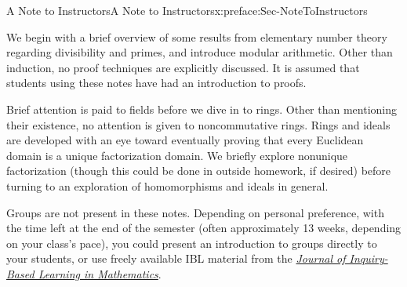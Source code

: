 \documentclass[oneside,10pt,]{book}
\numberwithin{equation}{section}
\begin{document}
\begin{preface}{A Note to Instructors}{}{A Note to Instructors}{}{}{x:preface:Sec-NoteToInstructors}
\begin{itemize}[label=\textbullet]
\end{itemize}
%
\par
We begin with a brief overview of some results from elementary number theory regarding divisibility and primes, and introduce modular arithmetic. Other than induction, no proof techniques are explicitly discussed. It is assumed that students using these notes have had an introduction to proofs.%
\par
Brief attention is paid to fields before we dive in to rings. Other than mentioning their existence, no attention is given to noncommutative rings. Rings and ideals are developed with an eye toward eventually proving that every Euclidean domain is a unique factorization domain. We briefly explore nonunique factorization (though this could be done in outside homework, if desired) before turning to an exploration of homomorphisms and ideals in general.%
\par
Groups are not present in these notes. Depending on personal preference, with the time left at the end of the semester (often approximately 1\textendash{}3 weeks, depending on your class's pace), you could present an introduction to groups directly to your students, or use freely available IBL material from the \href{http://jiblm.org/}{\emph{Journal of Inquiry-Based Learning in Mathematics}}.%
\end{preface}
\setcounter{tocdepth}{1}
\renewcommand*\contentsname{Contents}
\tableofcontents
\mainmatter
%
%
\typeout{************************************************}
\typeout{************************************************}
%
\end{document}
